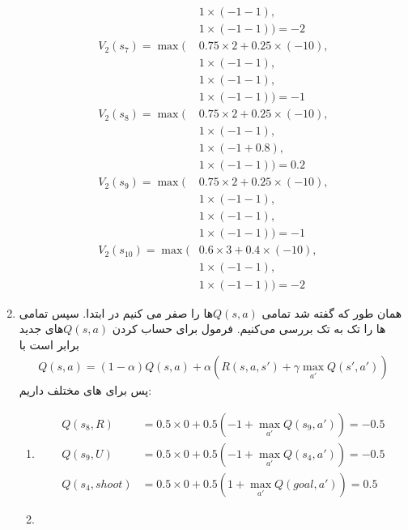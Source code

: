 \begin{enumerate}
\begin{align*}
            &1 \times (-1 - 1),\\
            &1 \times (-1 - 1)
        ) = -2\\
        V_2(s_7) = \max(
            &0.75 \times 2 + 0.25 \times (-10),\\
            &1 \times (-1 - 1),\\
            &1 \times (-1 - 1),\\
            &1 \times (-1 - 1)
        ) = -1\\
        V_2(s_8) = \max(
            &0.75 \times 2 + 0.25 \times (-10),\\
            &1 \times (-1 - 1),\\
            &1 \times (-1 + 0.8),\\
            &1 \times (-1 - 1)
        ) = 0.2\\
        V_2(s_9) = \max(
            &0.75 \times 2 + 0.25 \times (-10),\\
            &1 \times (-1 - 1),\\
            &1 \times (-1 - 1),\\
            &1 \times (-1 - 1)
        ) = -1\\
        V_2(s_{10}) = \max(
            &0.6 \times 3 + 0.4 \times (-10),\\
            &1 \times (-1 - 1),\\
            &1 \times (-1 - 1)
        ) = -2
    \end{align*}
    \item همان طور که گفته شد تمامی $Q(s, a)$ها را صفر می کنیم در ابتدا.
    سپس تمامی ها
    را تک به تک بررسی می‌کنیم.
    فرمول برای حساب کردن
    $Q(s, a)$های
    جدید برابر است با
    \begin{gather*}
        Q(s, a) = (1 - \alpha) Q(s, a) + \alpha (R(s, a, s') + \gamma \max_{a'} Q(s', a'))
    \end{gather*}
    پس برای
    های
    مختلف داریم:
    \begin{enumerate}
        \item \begin{align*}
            Q(s_8, R) &= 0.5 \times 0 + 0.5 (-1 + \max_{a'} Q(s_9, a')) = -0.5\\
            Q(s_9, U) &= 0.5 \times 0 + 0.5 (-1 + \max_{a'} Q(s_4, a')) = -0.5\\
            Q(s_4, shoot) &= 0.5 \times 0 + 0.5 (1 + \max_{a'} Q(goal, a')) = 0.5
        \end{align*}
        \item \begin{align*}

\end{align*}
\end{enumerate}
\end{enumerate}
